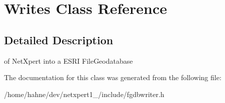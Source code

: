 \hypertarget{classWrites}{}\section{Writes Class Reference}
\label{classWrites}


\subsection{Detailed Description}
of Net\+Xpert into a E\+S\+RI File\+Geodatabase 

The documentation for this class was generated from the following file\+:\begin{DoxyCompactItemize}
\item 
/home/hahne/dev/netxpert1\+\_/include/fgdbwriter.\+h\end{DoxyCompactItemize}
